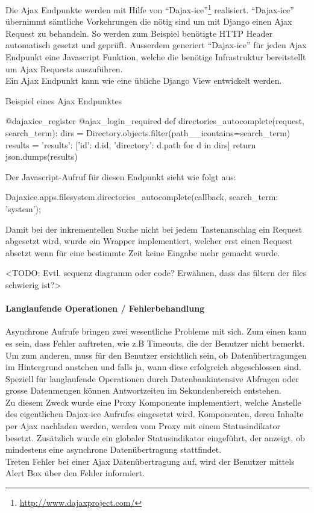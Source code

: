 Die Ajax Endpunkte werden mit Hilfe von
\enquote{Dajax-ice}\footnote{\url{http://www.dajaxproject.com/}} realisiert.
\enquote{Dajax-ice} übernimmt sämtliche Vorkehrungen die nötig sind um mit Django
einen Ajax Request zu behandeln. So werden zum Beispiel benötigte HTTP Header
automatisch gesetzt und geprüft. Ausserdem generiert \enquote{Dajax-ice} für
jeden Ajax Endpunkt eine Javascript Funktion, welche die benötige Infrastruktur bereitstellt um Ajax Requests auszuführen.
\\
Ein Ajax Endpunkt kann wie eine übliche Django View entwickelt werden.

\begin{listing}
\caption{Beispiel eines Ajax Endpunktes}
\begin{pythoncode}
@dajaxice_register
@ajax_login_required
def directories_autocomplete(request, search_term):
    dirs = Directory.objects.filter(path__icontains=search_term)
    results = {'results': [{'id': d.id, 'directory': d.path} for d in dirs]}
    return json.dumps(results)
\end{pythoncode}
\end{listing}

Der Javascript-Aufruf für diesen Endpunkt sieht wie folgt aus:

\begin{jscode}
Dajaxice.apps.filesystem.directories_autocomplete(callback, {search_term: 'system'});
\end{jscode} 

Damit bei der inkrementellen Suche nicht bei jedem Tastenanschlag ein Request
abgesetzt wird, wurde ein Wrapper implementiert, welcher erst einen Request
absetzt wenn für eine bestimmte Zeit keine Eingabe mehr gemacht wurde.

<TODO: Evtl. sequenz diagramm oder code? Erwähnen, dass das filtern der files schwierig ist?>

\paragraph{Langlaufende Operationen / Fehlerbehandlung}
Asynchrone Aufrufe bringen zwei wesentliche Probleme mit sich. Zum einen kann es sein, dass Fehler auftreten, wie z.B Timeouts, die der Benutzer nicht bemerkt. Um zum anderen, muss für den Benutzer ersichtlich sein, ob Datenübertragungen im Hintergrund anstehen und falls ja, wann diese erfolgreich abgeschlossen sind. Speziell für langlaufende Operationen durch Datenbankintensive Abfragen oder grosse Datenmengen können Antwortzeiten im Sekundenbereich entstehen. \\
Zu diesem Zweck wurde eine Proxy Komponente implementiert, welche Anstelle des eigentlichen Dajax-ice Aufrufes eingesetzt wird. Komponenten, deren Inhalte per Ajax nachladen werden, werden vom Proxy mit einem Statusindikator besetzt. Zusätzlich wurde ein globaler Statusindikator eingeführt, der anzeigt, ob mindestens eine asynchrone Datenübertragung stattfindet.\\
Treten Fehler bei einer Ajax Datenübertragung auf, wird der Benutzer mittels Alert Box über den Fehler informiert.

